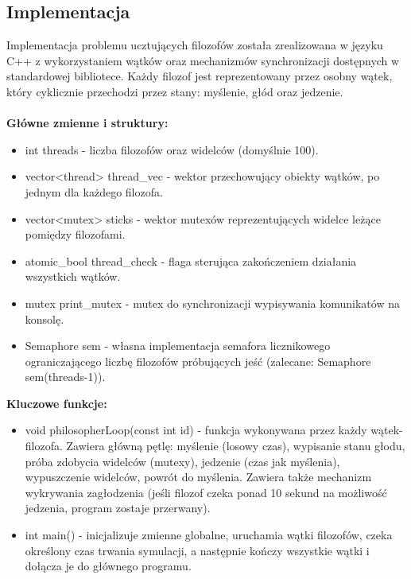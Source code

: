 \documentclass[a4paper,12pt]{article}
\begin{document}
        \subsection{Implementacja}
            \vspace{1em}
            Implementacja problemu ucztujących filozofów została zrealizowana w języku C++ z wykorzystaniem wątków oraz mechanizmów synchronizacji dostępnych w standardowej bibliotece. Każdy filozof jest reprezentowany przez osobny wątek, który cyklicznie przechodzi przez stany: myślenie, głód oraz jedzenie.\\
            \vspace*{1em}\\
        	\hspace{-0.5em}\textbf{Główne zmienne i struktury:}
            \begin{itemize}
                \item int threads - liczba filozofów oraz widelców (domyślnie 100).
                \item vector<thread> thread\_vec - wektor przechowujący obiekty wątków, po jednym dla każdego filozofa.
                \item vector<mutex> sticks - wektor mutexów reprezentujących widelce leżące pomiędzy filozofami.
                \item atomic\_bool thread\_check - flaga sterująca zakończeniem działania wszystkich wątków.
                \item mutex print\_mutex - mutex do synchronizacji wypisywania komunikatów na konsolę.
                \item Semaphore sem - własna implementacja semafora licznikowego ograniczającego liczbę filozofów próbujących jeść (zalecane: Semaphore sem(threads-1)).
            \end{itemize}
            \vspace{1.5em}
        	\textbf{Kluczowe funkcje:}
            \begin{itemize}
                \item void philosopherLoop(const int id) - funkcja wykonywana przez każdy wątek-filozofa. Zawiera główną pętlę: myślenie (losowy czas), wypisanie stanu głodu, próba zdobycia widelców (mutexy), jedzenie (czas jak myślenia), wypuszczenie widelców, powrót do myślenia. Zawiera także mechanizm wykrywania zagłodzenia (jeśli filozof czeka ponad 10 sekund na możliwość jedzenia, program zostaje przerwany).
                \item int main() - inicjalizuje zmienne globalne, uruchamia wątki filozofów, czeka określony czas trwania symulacji, a następnie kończy wszystkie wątki i dołącza je do głównego programu.
            \end{itemize}
\end{document}
